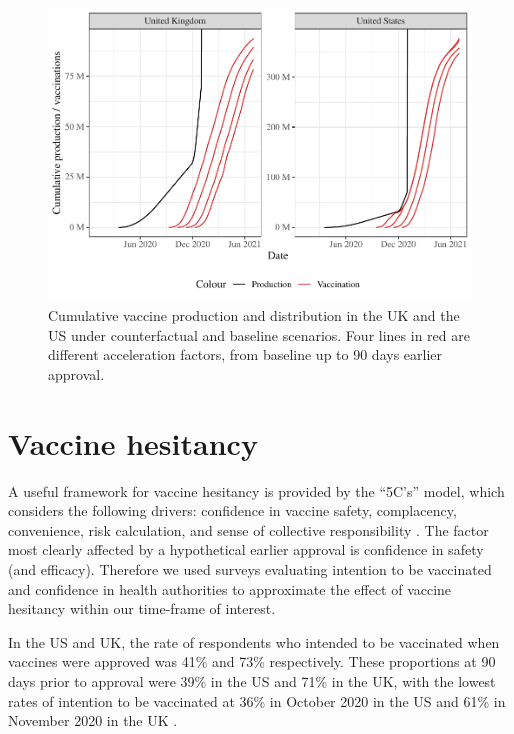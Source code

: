 \documentclass{article}
\begin{document}
\begin{figure}[H]

{\centering \includegraphics[height=0.4\textheight,]{_main_files/figure-latex/prod-cap-1}

}

\caption{Cumulative vaccine production and distribution in the UK and the US under counterfactual and baseline scenarios. Four lines in red are different acceleration factors, from baseline up to 90 days earlier approval.}\label{fig:prod-cap}
\end{figure}

\section{Vaccine hesitancy}\label{vaccine-hesitancy}

A useful framework for vaccine hesitancy is provided by the ``5C's'' model, which considers the following drivers: confidence in vaccine safety, complacency, convenience, risk calculation, and sense of collective responsibility \citep{Machingaidze2021Understanding}. The factor most clearly affected by a hypothetical earlier approval is confidence in safety (and efficacy). Therefore we used surveys evaluating intention to be vaccinated and confidence in health authorities to approximate the effect of vaccine hesitancy within our time-frame of interest.

In the US and UK, the rate of respondents who intended to be vaccinated when vaccines were approved was 41\% and 73\% respectively. These proportions at 90 days prior to approval were 39\% in the US and 71\% in the UK, with the lowest rates of intention to be vaccinated at 36\% in October 2020 in the US and 61\% in November 2020 in the UK \citep[@Freeman2022COVID]{YouGov2023COVID}.
\end{document}
